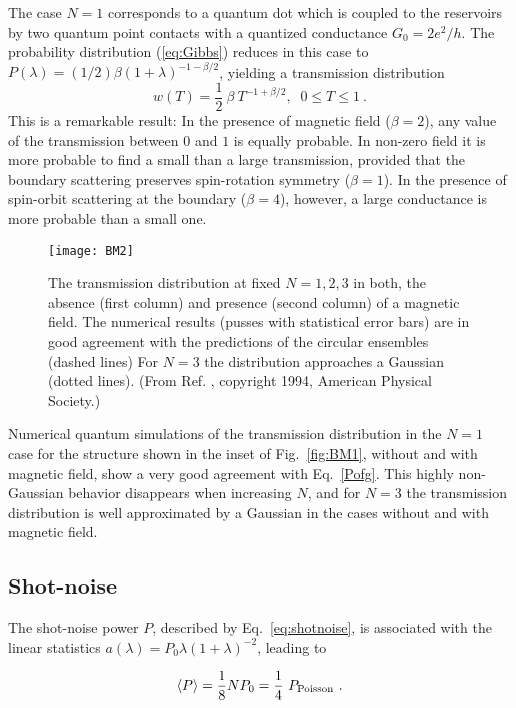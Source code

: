 \documentclass[a4paper,10pt]{article}
\newcommand{\nin}{\noindent}
\newcommand{\be}{\begin{equation}}
\newcommand{\ee}{\end{equation}}
\begin{document}
The case $N=1$ corresponds to a quantum dot which is coupled to the reservoirs by two quantum point contacts with a quantized conductance $G_0=2e^{2}/h$. The probability distribution (\ref{eq:Gibbs}) reduces in this case to
$P(\lambda)=(1/2)\beta(1+\lambda)^{-1-\beta/2}$, yielding a transmission  distribution \cite{BarMel,JPB}
\begin{equation}
w(T)=\frac{1}{2} \ \beta \ T^{-1+\beta/2}, \;\;0\leq T\leq 1 \ .
\label{Pofg}
\end{equation}
This is a remarkable result: In the presence of magnetic field
($\beta=2$), any value of the transmission between $0$ and $1$ is
equally probable. In non-zero field it is more probable to find a small
than a large transmission, provided that the boundary scattering
preserves spin-rotation symmetry ($\beta=1$). In the presence of
spin-orbit scattering at the boundary ($\beta=4$), however, a large
conductance is more probable than a small one. 

\begin{figure}
\centerline{\texttt{[image: BM2]}}
\caption{
The transmission distribution at fixed $N = 1, 2, 3$ in both, the absence (first column) and presence (second column) of a magnetic field. The numerical results (pusses with statistical error bars) are in good agreement with the predictions of the circular ensembles (dashed lines) 
For $N = 3$ the distribution approaches a Gaussian (dotted lines). 
(From Ref. \protect\cite{BarMel}, copyright 1994, American Physical Society.)
}
\label{fig:BM2}
\end{figure}

\nin Numerical quantum simulations of the transmission distribution in the $N=1$ case for the structure shown in the inset of Fig.~\ref{fig:BM1}, without and with magnetic field, show a very good agreement with Eq.~\eqref{Pofg}. This highly non-Gaussian behavior disappears when increasing $N$, and for $N=3$ the transmission distribution is well approximated by a Gaussian in the cases without and with magnetic field. 


\subsection{Shot-noise}

The shot-noise power $P$, described by Eq.~\eqref{eq:shotnoise}, is associated with the linear statistics $a(\lambda)=P_{0}\lambda(1+\lambda)^{-2}$, leading to \cite{JPB}

\be
\langle P\rangle =\frac{1}{8} N P_{0} = \frac{1}{4} \ P_{\rm Poisson} \ .
\ee
\end{document}
